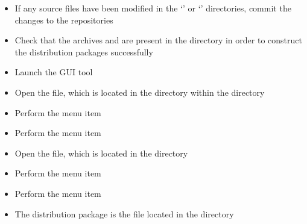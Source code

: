 \begin{itemize}
\item If any source files have been modified in the `' or
`' directories, commit the changes to the
 repositories
\item\exSp{}Check that the archives  and  are
present in the  directory in order to construct the distribution
packages successfully
\item\exSp{}Launch the  GUI tool
\item\exSp{}Open the  file, which is located in the
 directory within the 
directory
\item\exSp{}Perform the menu item 
\item\exSp{}Perform the menu item 
\item\exSp{}Open the  file, which is located in the
 directory
\item\exSp{}Perform the menu item 
\item\exSp{}Perform the menu item 
\item\exSp{}The distribution package is the  file located in the
 directory
\end{itemize}
\tertiaryEnd
{}
